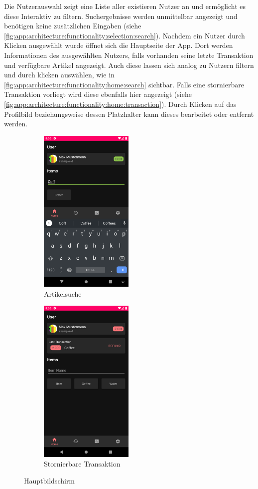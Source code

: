\documentclass[a4paper, 11pt]{article}
\begin{document}
Die Nutzerauswahl zeigt eine Liste aller existieren Nutzer an und ermöglicht es diese Interaktiv zu filtern.
Suchergebnisse werden unmittelbar angezeigt und benötigen keine zusätzlichen Eingaben (siehe \autoref{fig:app:architecture:functionality:selection:search}).
Nachdem ein Nutzer durch Klicken ausgewählt wurde öffnet sich die Hauptseite der App.
Dort werden Informationen des ausgewählten Nutzers, falls vorhanden seine letzte Transaktion und verfügbare Artikel angezeigt.
Auch diese lassen sich analog zu Nutzern filtern und durch klicken auswählen, wie in \autoref{fig:app:architecture:functionality:home:search} sichtbar.
Falls eine stornierbare Transaktion vorliegt wird diese ebenfalls hier angezeigt (siehe \autoref{fig:app:architecture:functionality:home:transaction}).
Durch Klicken auf das Profilbild beziehungsweise dessen Platzhalter kann dieses bearbeitet oder entfernt werden.
\begin{figure}[]
	\begin{subfigure}{.5\textwidth}
		\centering
		\includegraphics[height=8cm,keepaspectratio]{./images/screenshots/home-fragment.png}
		\caption{Artikelsuche}
		\label{fig:app:architecture:functionality:home:search}
	\end{subfigure}
	\begin{subfigure}{.5\textwidth}
		\centering
		\includegraphics[height=8cm,keepaspectratio]{./images/screenshots/home-fragment-transaction.png}
		\caption{Stornierbare Transaktion}
		\label{fig:app:architecture:functionality:home:transaction}
	\end{subfigure}
	\caption{Hauptbildschirm}
	\label{fig:app:architecture:functionality:home}
\end{figure}
\end{document}
